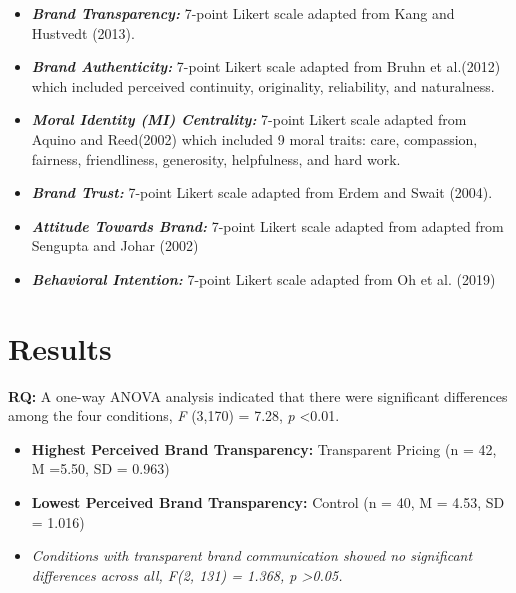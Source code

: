 \documentclass[a0,portrait]{a0poster}
\begin{document}
\begin{minipage}[c]{\linewidth}
\begin{framed}
\begin{multicols}{2}
\begin{itemize}
\begin{itemize} \item 
\textbf{\emph{Brand Transparency:}} 7-point Likert scale adapted from Kang and Hustvedt (2013).
\end{itemize}
\begin{itemize}
    \item \textbf{\emph{Brand Authenticity:}} 7-point Likert scale adapted from Bruhn et al.(2012) which included perceived continuity, originality, reliability, and naturalness.
\end{itemize}
\begin{itemize} \item
\textbf{\emph{Moral Identity (MI) Centrality:}} 7-point Likert scale adapted from Aquino and Reed(2002) which included 9 moral traits: care, compassion, fairness, friendliness, generosity, helpfulness, and hard work. 
\end{itemize}
\begin{itemize} \item
\textbf{\emph{Brand Trust:}} 7-point Likert scale adapted from
Erdem and Swait (2004).
\end{itemize}
\begin{itemize} \item
\textbf{\emph{Attitude Towards Brand:}} 7-point Likert scale adapted from adapted from Sengupta and Johar (2002)
\end{itemize}
\begin{itemize} \item
\textbf{\emph{Behavioral Intention:}} 7-point Likert scale adapted from Oh et al. (2019)
\end{itemize}
\end{itemize}
\color{Maroon}
\section*{Results}
\color{Black}
\color{Maroon} \textbf{RQ:} \color{Black} A one-way ANOVA analysis indicated that there were significant
differences among the four conditions, \emph{F} (3,170) = 7.28, \emph{p} \textless0.01.
\begin{itemize}
    \item \textbf{Highest Perceived Brand Transparency:} Transparent Pricing (n = 42, M =5.50, SD = 0.963)
      \item \textbf{Lowest Perceived Brand Transparency:} Control (n = 40, M = 4.53, SD = 1.016)
      \item \emph{Conditions with transparent brand communication showed no significant differences across all, \emph{F}(2, 131) = 1.368, \emph{p} \textgreater 0.05.}
\end{itemize}



\end{multicols}
\end{framed}
\end{minipage}
\end{document}
